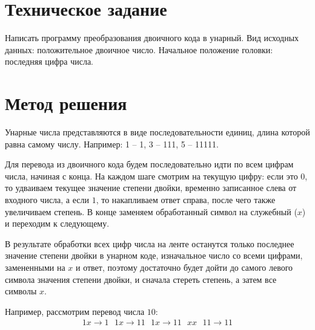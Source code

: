 \documentclass[a4paper,12pt]{article}
\begin{document}
    
    \newpage
    \renewcommand\contentsname{\centerline{Содержание}}
    \tableofcontents
    \newpage

    \section{Техническое задание}

    Написать программу преобразования двоичного кода в унарный.
    Вид исходных данных: положительное двоичное число.
    Начальное положение головки: последняя цифра числа.

    \section{Метод решения}
    Унарные числа представляются в виде последовательности единиц, длина которой равна самому числу.
    Например: 1 -- 1, 3 -- 111, 5 -- 11111.

    Для перевода из двоичного кода будем последовательно идти по всем цифрам числа, начиная с конца.
    На каждом шаге смотрим на текущую цифру: если это $0$, то удваиваем текущее значение
    степени двойки, временно записанное слева от входного числа, а если $1$, то накапливаем
    ответ справа, после чего также увеличиваем степень.
    В конце заменяем обработанный символ на служебный ($x$) и переходим к следующему.

    В результате обработки всех цифр числа на ленте останутся только последнее значение степени двойки в унарном коде,
    изначальное число со всеми цифрами, замененными на $x$ и ответ, поэтому достаточно будет дойти до самого левого символа
    значения степени двойки, и сначала стереть степень, а затем все символы $x$.

    \vspace{5mm}
    Например, рассмотрим перевод числа $10$:
    \begin{gather*}
        1x \rightarrow 1\text{ }1x \rightarrow 11\text{ }1x \rightarrow 11\text{ }xx\text{ }11 \rightarrow 11\\
    \end{gather*}
\end{document}
